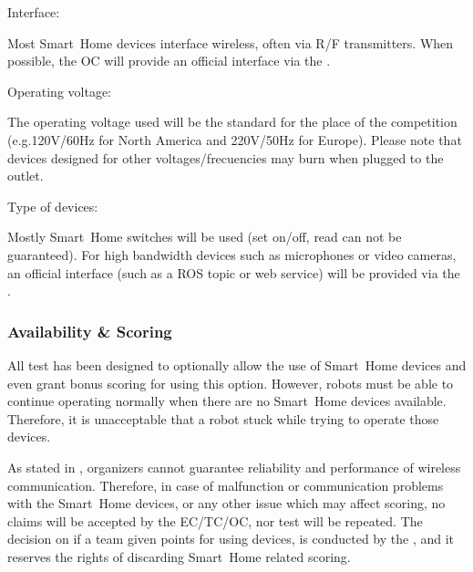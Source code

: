 \begin{enumerate}
	{\bf\item Interface:} Most Smart~Home devices interface wireless, often via R/F transmitters. When possible, the OC will provide an official interface via the .
	{\bf\item Operating voltage:} The operating voltage used will be the standard for the place of the competition (e.g.120V/60Hz for North America and 220V/50Hz for Europe). Please note that devices designed for other voltages/frecuencies may burn when plugged to the outlet.
	{\bf\item Type of devices:} Mostly Smart~Home switches will be used (set on/off, read can not be guaranteed). For high bandwidth devices such as microphones or video cameras, an official interface (such as a ROS topic or web service) will be provided via the .
\end{enumerate}

\subsubsection{Availability \& Scoring}
All test has been designed to optionally allow the use of Smart~Home devices and even grant bonus scoring for using this option. However, robots must be able to continue operating normally when there are no Smart~Home devices available. Therefore, it is unacceptable that a robot stuck while trying to operate those devices.

As stated in , organizers cannot guarantee reliability and performance of wireless communication. Therefore, in case of malfunction or communication problems with the Smart~Home devices, or any other issue which may affect scoring, no claims will be accepted by the EC/TC/OC, nor test will be repeated. The decision on if a team given points for using  devices, is conducted by the , and it reserves the rights of discarding Smart~Home related scoring.


